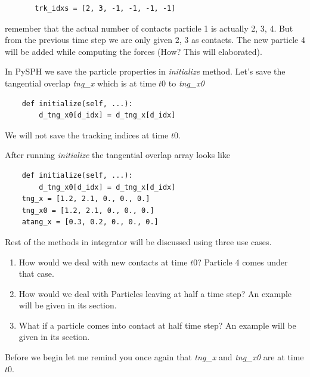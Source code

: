 \documentclass[11pt]{article}
\begin{document}
\begin{verbatim}
       trk_idxs = [2, 3, -1, -1, -1, -1]
\end{verbatim}

\noindent remember that the actual number of contacts particle 1 is actually
2, 3, 4. But from the previous time step we are only given 2, 3 as
contacts. The new particle 4 will be added while computing the forces (How?
This will elaborated).

In PySPH we save the particle properties in \emph{initialize} method. Let's save the
tangential overlap \emph{tng\_x} which is at time \(t0\) to \emph{tng\_x0}

\begin{verbatim}
	def initialize(self, ...):
	    d_tng_x0[d_idx] = d_tng_x[d_idx]
\end{verbatim}

We will not save the tracking indices at time \(t0\).

After running \emph{initialize} the tangential overlap array looks like

\begin{verbatim}
	def initialize(self, ...):
	    d_tng_x0[d_idx] = d_tng_x[d_idx]
	tng_x = [1.2, 2.1, 0., 0., 0.]
	tng_x0 = [1.2, 2.1, 0., 0., 0.]
	atang_x = [0.3, 0.2, 0., 0., 0.]
\end{verbatim}


Rest of the methods in integrator will be discussed using three use cases.

\begin{enumerate}
\item How would we deal with new contacts at time \(t0\)? Particle 4 comes under that case.
\item How would we deal with Particles leaving at half a time step? An example
will be given in its section.
\item What if a particle comes into contact at half time step? An example will be
given in its section.
\end{enumerate}

Before we begin let me remind you once again that \emph{tng\_x} and \emph{tng\_x0} are at time \(t0\).
\end{document}
